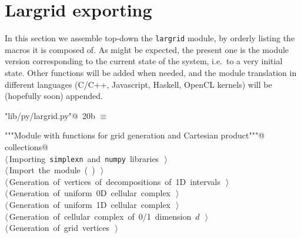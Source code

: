 \documentclass[11pt,oneside]{article}	%
\begin{document}
\section{Largrid exporting}
\label{sec:largrid}
In this section we assemble top-down the \texttt{largrid} module, by orderly listing the macros it is composed of. As might be expected, the present one is the module version corresponding to the current state of the system, i.e.~to a very initial state. Other functions will be added when needed, and the module translation in different languages (C/C++, Javascript, Haskell, OpenCL kernels) will be (hopefully soon) appended.
\begin{flushleft} \small \label{scrap30}
\protect{}\verb@"lib/py/largrid.py"@\nobreak\ {\footnotesize 20b }$\equiv$
\vspace{-1ex}
\begin{list}{}{} \item
\mbox{}\verb@"""Module with functions for grid generation and Cartesian product"""@\\
\mbox{}\verb@import collections@\\
\mbox{}\verb@@\hbox{$\langle\,$Importing \texttt{simplexn} and \texttt{numpy} libraries\nobreak\ {\footnotesize {}}$\,\rangle$}\verb@@\\
\mbox{}\verb@@\hbox{$\langle\,$Import the module\nobreak\ ({\footnotesize {}\label{scrap31}
 }\mbox{}\verb@larcc@ ) {\footnotesize {}}$\,\rangle$}\verb@@\\
\mbox{}\verb@@\hbox{$\langle\,$Generation of vertices of decompositions of 1D intervals\nobreak\ {\footnotesize {}}$\,\rangle$}\verb@@\\
\mbox{}\verb@@\hbox{$\langle\,$Generation of uniform 0D cellular complex\nobreak\ {\footnotesize {}}$\,\rangle$}\verb@@\\
\mbox{}\verb@@\hbox{$\langle\,$Generation of uniform 1D cellular complex\nobreak\ {\footnotesize {}}$\,\rangle$}\verb@@\\
\mbox{}\verb@@\hbox{$\langle\,$Generation of cellular complex of 0/1 dimension $d$\nobreak\ {\footnotesize {}}$\,\rangle$}\verb@@\\
\mbox{}\verb@@\hbox{$\langle\,$Generation of grid vertices\nobreak\ {\footnotesize {}}$\,\rangle$}\verb@@\\

\end{list}
\end{flushleft}
\end{document}
